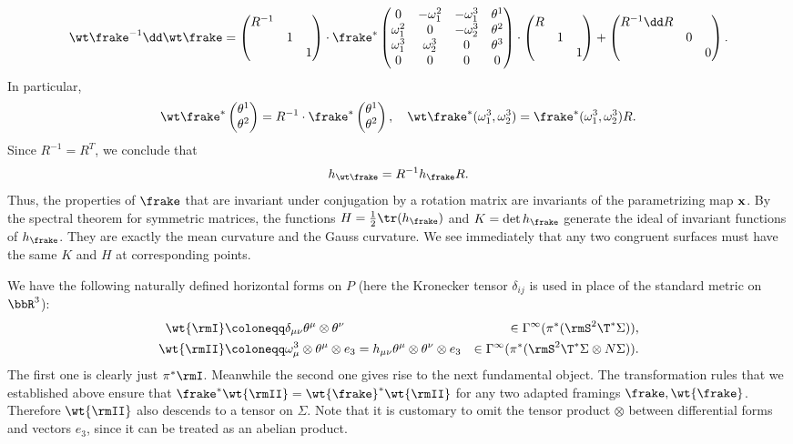 \[\wt\frake^{-1}\dd\wt\frake=
\begin{pmatrix}
    R^{-1} &&\\
    &1 &\\
    &&1
\end{pmatrix}\cdot
\frake^\ast 
\begin{pmatrix}
    0 & -\omega_1^2 & -\omega_1^3& \theta^1\\
    \omega_1^2 & 0 & -\omega_2^3 & \theta^2\\
    \omega_1^3 & \omega_2^3 & 0 & \theta^3\\
    0 & 0& 0& 0
\end{pmatrix}\cdot
\begin{pmatrix}
    R &&\\
    &1 &\\
    &&1
\end{pmatrix}+
\begin{pmatrix}
    R^{-1}\dd R &&\\
    &0 &\\
    &&0
\end{pmatrix}.
\]
In particular, 
\[\wt\frake^\ast \begin{pmatrix}
    \theta^1 \\ \theta^2
\end{pmatrix}=R^{-1}\cdot \frake^\ast \begin{pmatrix}
    \theta^1 \\ \theta^2
\end{pmatrix},
\quad 
\wt\frake^\ast(\omega_1^3,\omega_2^3)=\frake^\ast(\omega_1^3,\omega_2^3)R.
\]
Since $R^{-1}=R^T$, we conclude that 
\[h_{\wt\frake}=R^{-1}h_\frake R.\]
Thus, the properties of $\frake$ that are invariant under conjugation by a rotation matrix are invariants of the parametrizing map $\bf{x}$. By the spectral theorem for symmetric matrices, the functions $H=\frac12 \tr(h_\frake)$ and $K=\det h_\frake$ generate the ideal of invariant functions of $h_\frake$. They are exactly the mean curvature and the Gauss curvature. We see immediately that any two congruent surfaces must have the same $K$ and $H$ at corresponding points.


We have the following naturally defined horizontal forms on $P$ (here the Kronecker tensor $\delta_{ij}$ is used in place of the standard metric on $\bbR^3$):
\begin{align}
    \wt{\rmI}&\coloneqq \delta_{\mu\nu} \theta^\mu\otimes\theta^\nu &\in\Gamma^\infty(\pi^\ast(\rmS^2 \T^\ast \Sigma)),\\
    \wt{\rmII}&\coloneqq \omega^3_\mu\otimes\theta^\mu\otimes e_3=
    h_{\mu\nu}\theta^\mu\otimes\theta^\nu\otimes e_3
    &\in \Gamma^\infty(\pi^\ast(\rmS^2 \T^\ast \Sigma\otimes N\Sigma)).
\end{align}
The first one is clearly just $\pi^\ast\rmI$. Meanwhile the second one gives rise to the next fundamental object. The transformation rules that we established above ensure that $\frake^\ast \wt{\rmII}=\wt{\frake}^\ast \wt{\rmII}$ for any two adapted framings $\frake,\wt{\frake}$. Therefore $\wt{\rmII}$ also descends to a tensor on $\Sigma$. Note that it is customary to omit the tensor product $\otimes$ between differential forms and vectors $e_3$, since it can be treated as an abelian product.

